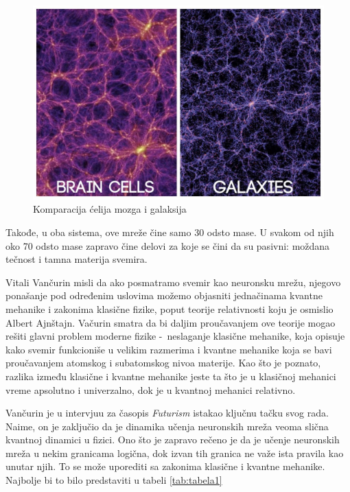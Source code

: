 \documentclass[a4paper]{article}
\begin{document}
\begin{figure}[h!]
\begin{center}
\includegraphics[scale=0.2]{komparacija.jpeg}
\end{center}
\caption{Komparacija ćelija mozga i galaksija}
\label{fig:komparacija}
\end{figure}

\justifying
Takođe, u oba sistema, ove mreže čine samo 30 odsto mase. U svakom od njih oko 70 odsto mase zapravo čine delovi za koje se čini da su pasivni: moždana tečnost i tamna materija svemira.

Vitali Vančurin misli da ako posmatramo svemir kao neuronsku mrežu, njegovo ponašanje pod određenim uslovima možemo objasniti jednačinama kvantne mehanike i zakonima klasične fizike, poput teorije relativnosti koju je osmislio Albert Ajnštajn. Vačurin smatra da bi daljim proučavanjem ove teorije mogao rešiti glavni problem moderne fizike \--\ neslaganje klasične mehanike,
koja opisuje kako svemir funkcioniše u velikim razmerima i kvantne mehanike koja se bavi proučavanjem atomskog i subatomskog nivoa materije.  Kao što je poznato, razlika između klasične i kvantne mehanike jeste ta što je u klasičnoj mehanici vreme apsolutno i univerzalno, dok je u kvantnoj mehanici relativno.

 Vančurin je u intervjuu za časopis \textit{Futurism} \cite{7} istakao ključnu tačku svog rada. Naime, on je zaključio da je dinamika učenja neuronskih mreža veoma slična kvantnoj dinamici u fizici. Ono što je zapravo rečeno je da je učenje neuronskih mreža u nekim granicama logična, dok izvan tih granica ne važe ista pravila kao unutar njih. To se može uporediti sa zakonima klasične i kvantne mehanike. Najbolje bi to bilo predstaviti u tabeli \ref{tab:tabela1}
 
\end{document}
